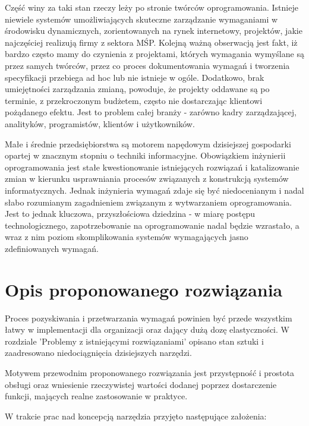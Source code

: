     Część winy za taki stan rzeczy leży po stronie twórców oprogramowania. Istnieje niewiele systemów umożliwiających skuteczne zarządzanie wymaganiami w środowisku dynamicznych, zorientowanych na rynek internetowy, projektów, jakie najczęściej realizują firmy z sektora MŚP. Kolejną ważną obserwacją jest fakt, iż bardzo często mamy do czynienia z projektami, których wymagania wymyślane są przez samych twórców, przez co proces dokumentowania wymagań i tworzenia specyfikacji przebiega ad hoc lub nie istnieje w ogóle. Dodatkowo, brak umiejętności zarządzania zmianą, powoduje, że projekty oddawane są po terminie, z przekroczonym budżetem, często nie dostarczając klientowi pożądanego efektu. Jest to problem całej branży - zarówno kadry zarządzającej, analityków, programistów, klientów i użytkowników. 

    Małe i średnie przedsiębiorstwa są motorem napędowym dzisiejszej gospodarki opartej w znacznym stopniu o techniki informacyjne. Obowiązkiem inżynierii oprogramowania jest stałe kwestionowanie istniejących rozwiązań i katalizowanie zmian w kierunku usprawniania procesów związanych z konstrukcją systemów informatycznych. Jednak inżynieria wymagań zdaje się być niedocenianym i nadal słabo rozumianym zagadnieniem związanym z wytwarzaniem oprogramowania. Jest to jednak kluczowa, przyszłościowa dziedzina - w miarę postępu technologicznego, zapotrzebowanie na oprogramowanie nadal będzie wzrastało, a wraz z nim poziom skomplikowania systemów wymagających jasno zdefiniowanych wymagań.

  \section{Opis proponowanego rozwiązania}

    Proces pozyskiwania i przetwarzania wymagań powinien być przede wszystkim łatwy w implementacji dla organizacji oraz dający dużą dozę elastyczności. W rozdziale 'Problemy z istniejącymi rozwiązaniami' opisano stan sztuki i zaadresowano niedociągnięcia dzisiejszych narzędzi. 

    Motywem przewodnim proponowanego rozwiązania jest przystępność i prostota obsługi oraz wniesienie rzeczywistej wartości dodanej poprzez dostarczenie funkcji, mających realne zastosowanie w praktyce. 

    W trakcie prac nad koncepcją narzędzia przyjęto następujące założenia:
    
